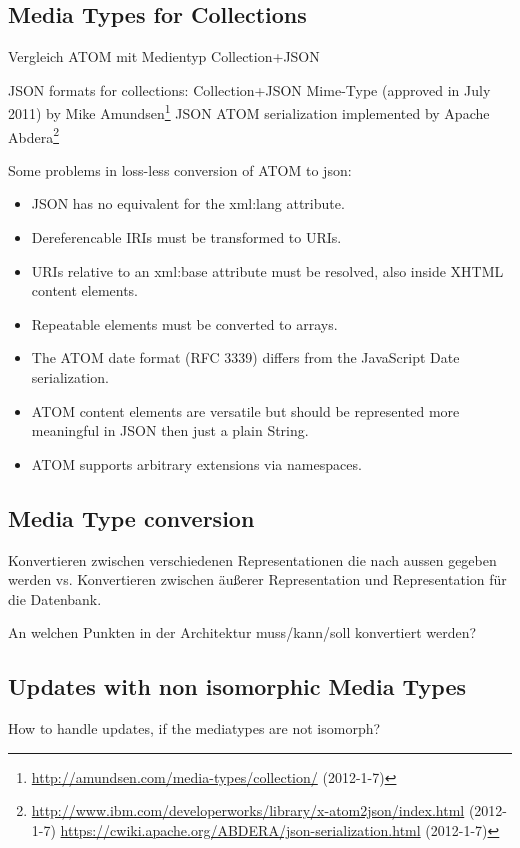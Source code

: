 \documentclass[12pt,a4paper]{scrartcl}		%
\newcommand{\citeurl}[2]{\url{#1} (#2)}
\begin{document}
\subsection{Media Types for Collections}
\label{sec:media-types-coll}
Vergleich ATOM mit Medientyp Collection+JSON

JSON formats for collections:
Collection+JSON Mime-Type (approved in July 2011) by Mike Amundsen\footnote{\citeurl{http://amundsen.com/media-types/collection/}{2012-1-7}}
JSON ATOM serialization implemented by Apache Abdera\footnote{\citeurl{http://www.ibm.com/developerworks/library/x-atom2json/index.html}{2012-1-7} \citeurl{https://cwiki.apache.org/ABDERA/json-serialization.html}{2012-1-7}}


Some problems in loss-less conversion of ATOM to json:\cite{Snell2008}
\begin{itemize}
  \item JSON has no equivalent for the xml:lang attribute.
  \item Dereferencable IRIs must be transformed to URIs.
  \item URIs relative to an xml:base attribute must be resolved, also inside XHTML content elements.
  \item Repeatable elements must be converted to arrays.
  \item The ATOM date format (RFC 3339) differs from the JavaScript Date serialization.
  \item ATOM content elements are versatile but should be represented more meaningful in JSON then just a plain String.
  \item ATOM supports arbitrary extensions via namespaces.
\end{itemize}


\subsection{Media Type conversion}

Konvertieren zwischen verschiedenen Representationen die nach aussen gegeben werden vs. Konvertieren zwischen äußerer Representation und Representation für die Datenbank.

An welchen Punkten in der Architektur muss/kann/soll konvertiert werden?

\subsection{Updates with non isomorphic Media Types}
How to handle updates, if the mediatypes are not isomorph?
\end{document}
